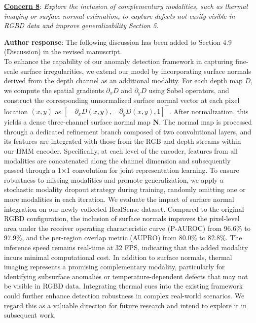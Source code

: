 \documentclass[a4paper,fleqnn]{cas-sc}
\begin{document}
\vspace{1em}

\noindent \textbf{\underline{Concern 8}}: \textit{Explore the inclusion of complementary modalities, such as thermal imaging or surface normal estimation, to capture defects not easily visible in RGBD data and improve generalizability Section 5. \\}

\noindent \textbf{Author response}: The following discussion has been added to Section 4.9 (Discussion) in the revised manuscript. \\

To enhance the capability of our anomaly detection framework in capturing fine-scale surface irregularities, we extend our model by incorporating surface normals derived from the depth channel as an additional modality. For each depth map \( D \), we compute the spatial gradients \( \partial_x D \) and \( \partial_y D \) using Sobel operators, and construct the corresponding unnormalized surface normal vector at each pixel location \((x, y)\) as \([-\,\partial_x D(x,y), -\,\partial_y D(x,y), 1]^\top\). After normalization, this yields a dense three-channel surface normal map \( \mathbf{N} \). The normal map is processed through a dedicated refinement branch composed of two convolutional layers, and its features are integrated with those from the RGB and depth streams within our HMM encoder. Specifically, at each level of the encoder, features from all modalities are concatenated along the channel dimension and subsequently passed through a 1\(\times\)1 convolution for joint representation learning. To ensure robustness to missing modalities and promote generalization, we apply a stochastic modality dropout strategy during training, randomly omitting one or more modalities in each iteration. We evaluate the impact of surface normal integration on our newly collected RealSense dataset. Compared to the original RGBD configuration, the inclusion of surface normals improves the pixel-level area under the receiver operating characteristic curve (P-AUROC) from 96.6\% to 97.9\%, and the per-region overlap metric (AUPRO) from 80.0\% to 82.8\%. The inference speed remains real-time at 32 FPS, indicating that the added modality incurs minimal computational cost. In addition to surface normals, thermal imaging represents a promising complementary modality, particularly for identifying subsurface anomalies or temperature-dependent defects that may not be visible in RGBD data. Integrating thermal cues into the existing framework could further enhance detection robustness in complex real-world scenarios. We regard this as a valuable direction for future research and intend to explore it in subsequent work.
\end{document}
